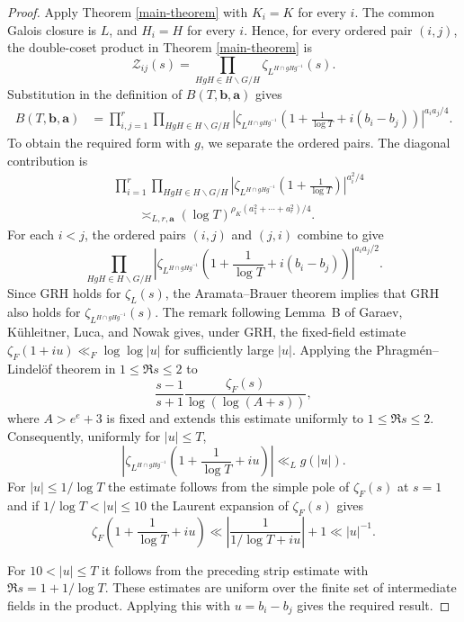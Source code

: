 \documentclass[twoside,reqno,11pt,a4paper]{amsart}
\numberwithin{equation}{section}
\theoremstyle{plain}
\theoremstyle{definition}
\theoremstyle{remark}
\newcommand{\calZ}{\mathcal Z}
\renewcommand{\le}{\leqslant}
\begin{document}
\begin{proof}
Apply Theorem \ref{main-theorem} with $K_i=K$ for every $i$. The common Galois closure is $L$, and $H_i=H$ for every $i$. Hence, for every ordered pair $(i,j)$, the double-coset product in Theorem \ref{main-theorem} is
\begin{equation*}
        \calZ_{ij}(s)=
        \prod_{HgH\in H\backslash G/H}
        \zeta_{L^{H\cap gHg^{-1}}}(s).
\end{equation*} Substitution in the definition of $B(T,\mathbf b,\mathbf a)$ gives
\begin{align*}
B(T,\mathbf b,\mathbf a)
&=
\prod_{i,j=1}^{r}
\prod_{HgH\in H\backslash G/H}
\left|
\zeta_{L^{H\cap gHg^{-1}}}
\left(
1+\frac1{\log T}+i(b_i-b_j)
\right)
\right|^{a_i a_j/4}.
\end{align*}
To obtain the required form with $g$, we separate the ordered pairs.  The diagonal contribution is
\begin{align*}
&\prod_{i=1}^{r}
\prod_{HgH\in H\backslash G/H}
\left|
\zeta_{L^{H\cap gHg^{-1}}}
\left(1+\frac1{\log T}\right)
\right|^{a_i^2/4}\\
&\qquad\asymp_{L,r,\mathbf a}
(\log T)^{\rho_K
(a_1^2+\cdots+a_r^2)/4}.
\end{align*}
For each $i<j$, the ordered pairs $(i,j)$ and $(j,i)$ combine to give
\begin{equation*}
\prod_{HgH\in H\backslash G/H}
\left|
\zeta_{L^{H\cap gHg^{-1}}}
\left(
1+\frac1{\log T}+i(b_i-b_j)
\right)
\right|^{a_i a_j/2}.
\end{equation*}
Since GRH holds for $\zeta_L(s)$, the Aramata--Brauer theorem \cite{Aramata, Brauer} implies that GRH also holds for $\zeta_{L^{H\cap gHg^{-1}}}(s)$. The remark following Lemma~B of Garaev, K\"uhleitner, Luca, and Nowak \cite[p.~304]{Garaev-Kuehleitner-Luca-Nowak} gives, under GRH, the fixed-field estimate $\zeta_F(1+iu)\ll_F\log\log |u|$ for sufficiently large $|u|$. Applying the Phragm\'en--Lindel\"of theorem in $1\le\Re s\le2$ to
\begin{equation*}
\frac{s-1}{s+1}\frac{\zeta_F(s)}{\log(\log(A+s))},
\end{equation*}
where $A>e^e+3$ is fixed and extends this estimate uniformly to $1\le\Re s\le2$. Consequently, uniformly for $|u|\le T$,
\begin{equation*}
        \left|\zeta_{L^{H\cap gHg^{-1}}}\left(1+\frac1{\log T}+iu\right)\right|\ll_L g(|u|).
\end{equation*}
For $|u|\le1/\log T$ the estimate follows from the simple pole of $\zeta_F(s)$ at $s=1$ and if $1/\log T<|u|\le10$ the Laurent expansion of $\zeta_F(s)$ gives
\begin{equation*}
    \zeta_F\!\left(1+\frac1{\log T}+iu\right)
\ll
\left|\frac1{1/\log T+iu}\right|+1
\ll
|u|^{-1}.
\end{equation*}

For $10<|u|\le T$ it follows from the preceding strip estimate with $\Re s=1+1/\log T$. These estimates are uniform over the finite set of intermediate fields in the product.
Applying this with $u=b_i-b_j$ gives the required result.
\end{proof}
\end{document}
